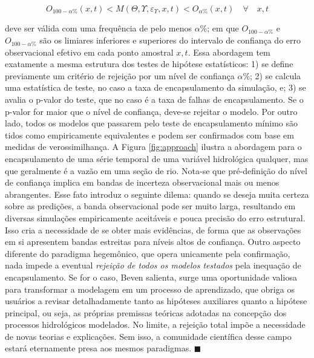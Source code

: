 \documentclass[./main.tex]{subfiles}
\begin{document}
\begin{linenomath*}
\begin{equation}
\label{eq:bracketing}
    O_{100-\alpha\%}(x, t) < M(\Theta, \Upsilon, \varepsilon_{\Upsilon}, x, t) < O_{\alpha\%}(x, t) \quad \forall \quad x, t
\end{equation}
\end{linenomath*}
deve ser válida com uma frequência de pelo menos $\alpha\%$; em que $O_{100-\alpha\%}$ e  $O_{100-\alpha\%}$ são os limiares inferiores e superiores do intervalo de confiança do erro observacional efetivo em cada ponto amostral $x, t$. Essa abordagem tem exatamente a mesma estrutura dos testes de hipótese estatísticos: 1) se define previamente um critério de rejeição por um nível de confiança $\alpha$\%; 2) se calcula uma estatística de teste, no caso a taxa de encapsulamento da simulação, e; 3) se avalia o p-valor do teste, que no caso é a taxa de falhas de encapsulamento. Se o p-valor for maior que o nível de confiança, deve-se rejeitar o modelo. Por outro lado, todos os modelos que passarem pelo teste de encapsulamento mínimo são tidos como empiricamente equivalentes e podem ser confirmados com base em medidas de verossimilhança. A Figura \ref{fig:approach} ilustra a abordagem para o encapsulamento de uma série temporal de uma variável hidrológica qualquer, mas que geralmente é a vazão em uma seção de rio. Nota-se que pré-definição do nível de confiança implica em bandas de incerteza observacional mais ou menos abrangentes. Esse fato introduz o seguinte dilema: quando se deseja muita certeza sobre as predições, a banda observacional pode ser muito larga, resultando em diversas simulações empiricamente aceitáveis e pouca precisão do erro estrutural. Isso cria a necessidade de se obter mais evidências, de forma que as observações em si apresentem bandas estreitas para níveis altos de confiança. Outro aspecto diferente do paradigma hegemônico, que opera unicamente pela confirmação, nada impede a eventual \textit{rejeição de todos os modelos testados} pela inequação de encapsulamento. Se for o caso, Beven salienta, surge uma oportunidade valiosa para transformar a modelagem em um processo de aprendizado, que obriga os usuários a revisar detalhadamente tanto as hipóteses auxiliares quanto a hipótese principal, ou seja, as próprias premissas teóricas adotadas na concepção dos processos hidrológicos modelados. No limite, a rejeição total impõe a necessidade de novas teorias e explicações. Sem isso, a comunidade científica desse campo estará eternamente presa aos mesmos paradigmas. $\blacksquare$
\end{document}
